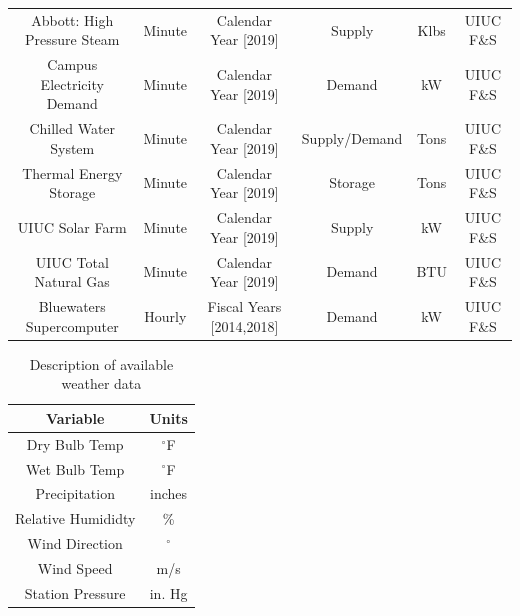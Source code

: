 \begin{landscape}
\begin{table}
\begin{tabular}{c|c|c|c|c|c}
      Abbott: High Pressure Steam & Minute & Calendar Year [2019] & Supply & Klbs & UIUC F\&S\\
      Campus Electricity Demand & Minute & Calendar Year [2019] & Demand & kW & UIUC F\&S\\
      Chilled Water System & Minute & Calendar Year [2019] & Supply/Demand & Tons & UIUC F\&S\\
      Thermal Energy Storage & Minute & Calendar Year [2019] & Storage & Tons & UIUC F\&S\\
      UIUC Solar Farm & Minute & Calendar Year [2019] & Supply & kW & UIUC F\&S\\
      UIUC Total Natural Gas & Minute & Calendar Year [2019] & Demand & BTU & UIUC F\&S\\
      Bluewaters Supercomputer & Hourly & Fiscal Years [2014,2018] & Demand & kW & UIUC F\&S\\
    \end{tabular}
  \end{table}
\end{landscape}


\begin{table}
  \centering
  \caption{Description of available weather data}
  \label{tab:weather}
  \begin{tabular}{c|c}
  \hline
  Variable  & Units\\
  \hline
  Dry Bulb Temp  & $^\circ$F\\
  Wet Bulb Temp  & $^\circ$F\\
  Precipitation  & inches \\
  Relative Humididty  & \%\\
  Wind Direction  & $^\circ$\\
  Wind Speed  & m/s\\
  Station Pressure & in. Hg \\
  \end{tabular}
\end{table}
